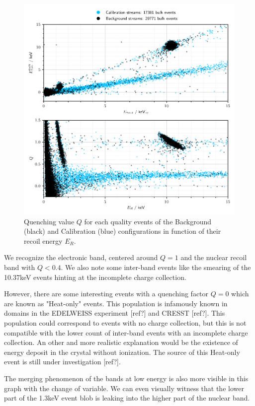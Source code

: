 \begin{figure}
\centering
\includegraphics[width=\linewidth,]{Figures/Neutron/background_calibration_comparison.pdf}
\caption{Quenching value $Q$ for each quality events of the Background (black) and Calibration (blue) configurations in function of their recoil energy $E_R$.}
\label{fig:quenching_plot}
\end{figure}

We recognize the electronic band, centered around $Q=1$ and the nuclear recoil band with $Q<0.4$. We also note some inter-band events like the smearing of the 10.37keV events hinting at the incomplete charge collection.

However, there are some interesting events with a quenching factor $Q=0$ which are known as "Heat-only" events. This population is infamously known in domains in the EDELWEISS experiment [ref?] and CRESST [ref?]. This population could correspond to events with no charge collection, but this is not compatible with the lower count of inter-band events with an incomplete charge collection. An other and more realistic explanation would be the existence of energy deposit in the crystal without ionization. The source of this Heat-only event is still under investigation [ref?].

The merging phenomenon of the bands at low energy is also more visible in this graph with the change of variable. We can even visually witness that the lower part of the 1.3keV event blob is leaking into the higher part of the nuclear band.

